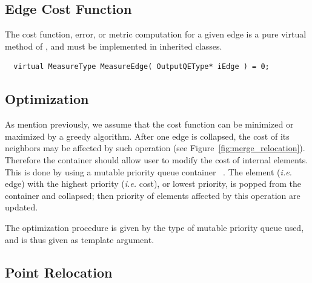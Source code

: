 \documentclass{InsightArticle}
\theoremstyle{plain}
\def \ie {\textit{i.e. }}
\begin{document}
\subsection{Edge Cost Function}
The cost function, error, or metric computation for a given edge  is a pure virtual method of
, and must be implemented in inherited classes.

\begin{verbatim}
  virtual MeasureType MeasureEdge( OutputQEType* iEdge ) = 0;
\end{verbatim}


\subsection{Optimization}
As mention previously, we assume that the cost function can be minimized or maximized by a greedy algorithm. After one edge is collapsed, the cost of its neighbors may be affected by such operation (see Figure~\ref{fig:merge_relocation}). Therefore the container should allow user to modify the cost of internal elements. This is done by using a mutable priority queue container ~\cite{itkPriorityQueueContainer}. The element (\ie edge) with the highest priority (\ie cost), or lowest priority, is popped from the container and collapsed; then priority of elements affected by this operation are updated.

The optimization procedure is given by the type of mutable priority queue used, and is thus given as template argument.

\subsection{Point Relocation}
\end{document}
